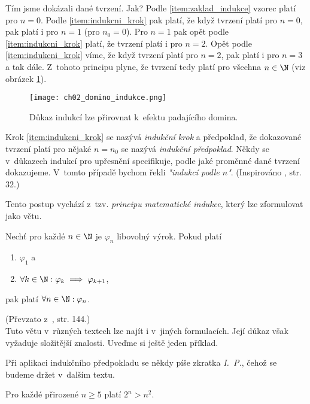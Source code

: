 Tím jsme dokázali dané tvrzení. Jak? Podle \ref{item:zaklad_indukce} vzorec platí pro $n=0$. Podle \ref{item:indukcni_krok} pak platí, že když tvrzení platí pro $n=0$, pak platí i pro $n=1$ (pro $n_0=0$). Pro $n=1$ pak opět podle \ref{item:indukcni_krok} platí, že tvrzení platí i pro $n=2$. Opět podle \ref{item:indukcni_krok} víme, že když tvrzení platí pro $n=2$, pak platí i pro $n=3$ a tak dále. Z~tohoto principu plyne, že tvrzení tedy platí pro všechna $n\in\N$ (viz obrázek \ref{fig:domino}).
\begin{figure}[H]
    \centering
    \texttt{[image: ch02\_domino\_indukce.png]}
    \caption{Důkaz indukcí lze přirovnat k~efektu padajícího domina.}
    \label{fig:domino}
\end{figure}
Krok \ref{item:indukcni_krok} se nazývá \emph{indukční krok} a předpoklad, že dokazované tvrzení platí pro nějaké $n=n_0$ se nazývá \emph{indukční předpoklad}. Někdy se v~důkazech indukcí pro upřesnění specifikuje, podle jaké proměnné dané tvrzení dokazujeme. V~tomto případě bychom řekli \emph{"indukcí podle $n$"}. (Inspirováno \cite{MatousekNesetril2009}, str. 32.)\par
Tento postup vychází z~tzv. \emph{principu matematické indukce}, který lze zformulovat jako větu.
\begin{theorem}
    Nechť pro každé $n\in\N$ je $\varphi_n$ libovolný výrok. Pokud platí
    \begin{enumerate}[label=(\roman*)]
        \item $\varphi_1$ a
        \item $\forall k\in\N: \varphi_k \implies \varphi_{k+1}$,
    \end{enumerate}
    pak platí $\forall n\in\N: \varphi_n$.
\end{theorem}
(Převzato z~\cite{ChartrandPolimeniZhang2014}, str. 144.)\\
Tuto větu v~různých textech lze najít i v~jiných formulacích. Její důkaz však vyžaduje složitější znalosti. Uveďme si ještě jeden příklad.
\begin{convention}
    Při aplikaci indukčního předpokladu se někdy píše zkratka \emph{I.~P.}, čehož se budeme držet v~dalším textu.
\end{convention}
\begin{proposition}
    Pro každé přirozené $n\geq 5$ platí $2^n>n^2$.
\end{proposition}

